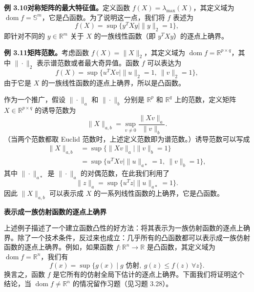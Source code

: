 \documentclass[UTF8,12pt,a4paper,fontset=fandol]{ctexart}
\DeclareMathOperator{\dom}{dom}
\begin{document}
\noindent\textbf{例 3.10\quad 对称矩阵的最大特征值。}\quad 定义函数 $f(X)=\lambda_{\max}(X)$，其定义域为 $\dom f=\mathbb{S}^m$，它是凸函数。为了说明这一点，我们将 $f$ 表述为
\[
f(X)=\sup\{y^TXy\mid \|y\|_2=1\},
\]
即针对不同的 $y\in\mathbb{R}^m$ 关于 $X$ 的一族线性函数（即 $y^TXy$）的逐点上确界。

\noindent\textbf{例 3.11\quad 矩阵范数。}\quad 考虑函数 $f(X)=\|X\|_2$，其定义域为 $\dom f=\mathbb{R}^{p\times q}$，其中 $\|\cdot\|_2$ 表示谱范数或者最大奇异值。函数 $f$ 可以表达为
\[
f(X)=\sup\{u^TXv\mid \|u\|_2=1,\ \|v\|_2=1\},
\]
由于它是 $X$ 的一族线性函数的逐点上确界，所以是凸函数。

作为一个推广，假设 $\|\cdot\|_a$ 和 $\|\cdot\|_b$ 分别是 $\mathbb{R}^p$ 和 $\mathbb{R}^q$ 上的范数，定义矩阵 $X\in\mathbb{R}^{p\times q}$ 的诱导范数为
\[
\|X\|_{a,b}=\sup_{v\neq0}\frac{\|Xv\|_a}{\|v\|_b}.
\]
（当两个范数都取 Euclid 范数时，上述定义范数即为谱范数。）诱导范数可以写成
\[
\begin{aligned}
\|X\|_{a,b}
&=\sup\{\|Xv\|_a\mid \|v\|_b=1\}\\
&=\sup\{u^TXv\mid \|u\|_{a*}=1,\ \|v\|_b=1\},
\end{aligned}
\]
其中 $\|\cdot\|_{a*}$ 是 $\|\cdot\|_a$ 的对偶范数，在此我们利用了
\[
\|z\|_a=\sup\{u^Tz\mid \|u\|_{a*}=1\}.
\]
因此 $\|X\|_{a,b}$ 可以表示成 $X$ 的一系列线性函数的上确界，它是凸函数。

\noindent\textbf{表示成一族仿射函数的逐点上确界}

上述例子描述了一个建立函数凸性的好方法：将其表示为一族仿射函数的逐点上确界。除了一个技术条件，反过来也成立：几乎所有的凸函数都可以表示成一族仿射函数的逐点上确界。例如，如果函数 $f:\mathbb{R}^n\to\mathbb{R}$ 是凸函数，其定义域为 $\dom f=\mathbb{R}^n$，我们有
\[
f(x)=\sup\{g(x)\mid g\text{ 仿射},\ g(z)\leq f(z)\ \forall z\}.
\]
换言之，函数 $f$ 是它所有的仿射全局下估计的逐点上确界。下面我们将证明这个结论，当 $\dom f\neq\mathbb{R}^n$ 的情况留作习题（见习题 3.28）。
\end{document}
